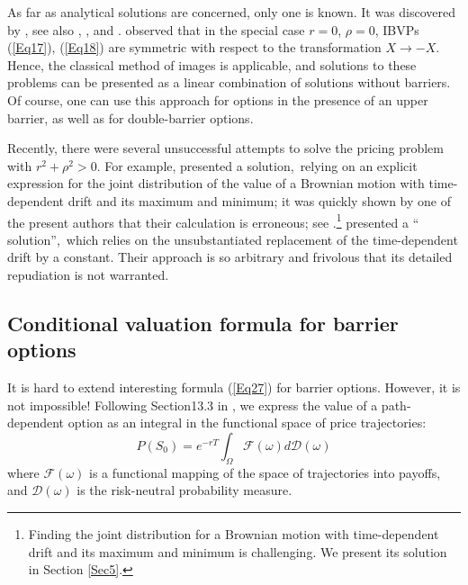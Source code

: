 \documentclass{article}
\begin{document}
As far as analytical solutions are concerned, only one is known. It was
discovered by \cite{Lipton1997}, see also \cite{Lipton2001}, \cite%
{Lipton2002b}, and \cite{Andreasen2001}. \cite{Lipton1997} observed that in
the special case $r=0$, $\rho =0$, IBVPs (\ref{Eq17}), (\ref{Eq18}) are
symmetric with respect to the transformation $X\rightarrow -X$. Hence, the
classical method of images is applicable, and solutions to these problems
can be presented as a linear combination of solutions without barriers. Of
course, one can use this approach for options in the presence of an upper
barrier, as well as for double-barrier options.

Recently, there were several unsuccessful attempts to solve the pricing
problem with $r^{2}+\rho ^{2}>0$. For example, \cite{Aquino2019} presented a
solution,\ relying on an explicit expression for the joint distribution of
the value of a Brownian motion with time-dependent drift and its maximum and
minimum; it was quickly shown by one of the present authors that their
calculation is erroneous; see \cite{Aquino2021}.\footnote{%
Finding the joint distribution for a Brownian motion with time-dependent
drift and its maximum and minimum is challenging. We present its solution in
Section \ref{Sec5}.} \cite{He2021} presented a \textquotedblleft
solution\textquotedblright ,\ which relies on the unsubstantiated
replacement of the time-dependent drift by a constant. Their approach is so
arbitrary and frivolous that its detailed repudiation is not warranted.

\subsection{Conditional valuation formula for barrier options\label{Sec32}}

It is hard to extend interesting formula (\ref{Eq27}) for barrier options.
However, it is not impossible! Following Section13.3 in \cite{Lipton2001},
we express the value of a path-dependent option as an integral in the
functional space of price trajectories: 
\begin{equation}
P(S_{0})=e^{-rT}\int_{\Omega }\mathcal{F}(\omega )d\mathcal{D}(\omega )
\label{Eq30}
\end{equation}%
where $\mathcal{F}(\omega )$ is a functional mapping of the space of
trajectories into payoffs, and $\mathcal{D}(\omega )$ is the risk-neutral
probability measure.
\end{document}
